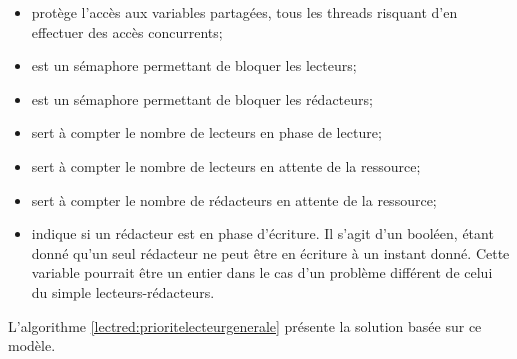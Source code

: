 \begin{itemize}
  \item {} protège l'accès aux variables partagées, tous les threads risquant d'en effectuer des accès concurrents;
  \item {} est un sémaphore permettant de bloquer les lecteurs;
  \item {} est un sémaphore permettant de bloquer les rédacteurs;
  \item {} sert à compter le nombre de lecteurs en phase de lecture;
  \item {} sert à compter le nombre de lecteurs en attente de la ressource;
  \item {} sert à compter le nombre de rédacteurs en attente de la ressource;
  \item {} indique si un rédacteur est en phase d'écriture. Il s'agit d'un booléen, étant donné qu'un seul rédacteur ne peut être en écriture à un instant donné. Cette variable pourrait être un entier dans le cas d'un problème différent de celui du simple lecteurs-rédacteurs.
\end{itemize}

L'algorithme \ref{lectred:prioritelecteurgenerale} présente la solution basée sur ce modèle.

